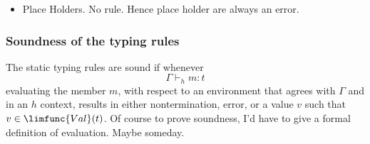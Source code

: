 \documentclass[12pt]{article}
\begin{document}
\begin{itemize}
\item Place Holders. No rule. Hence place holder are always an error.
\end{itemize}

\subsubsection{Soundness of the typing rules}

The static typing rules are sound if whenever%
\begin{equation*}
\Gamma \vdash _{h}m:t
\end{equation*}
evaluating the member $m$, with respect to an environment that agrees with $%
\Gamma $ and in an $h$ context, results in either nontermination, error, or
a value $v$ such that $v\in \limfunc{Val}(t)$. Of course to prove soundness,
I'd have to give a formal definition of evaluation. Maybe someday.
\end{document}
